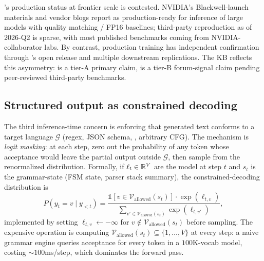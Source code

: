 \begin{contradiction}
's production status at frontier scale is contested. NVIDIA's
Blackwell-launch materials and vendor blogs report  as
production-ready for inference of large models with quality matching
 / FP16 baselines; third-party reproduction as of 2026-Q2 is sparse,
with most published benchmarks coming from NVIDIA-collaborator labs.
By contrast,  production training has independent confirmation
through 's open release \citep[\S 2.5]{deepseek-v3} and
multiple downstream replications. The KB reflects this asymmetry: 
is a tier-A primary claim,  is a tier-B forum-signal claim
pending peer-reviewed third-party benchmarks.
\end{contradiction}

\subsection{Structured output as constrained decoding}
\label{sec:constrained-decoding}

The third inference-time concern is enforcing that generated text
conforms to a target language $\mathcal{G}$ (regex, JSON schema, ,
arbitrary CFG). The mechanism is \emph{logit masking}: at each step,
zero out the probability of any token whose acceptance would leave the
partial output outside $\mathcal{G}$, then sample from the renormalized
distribution. Formally, if $\ell_t \in \mathbb{R}^V$ are the model  at
step $t$ and $s_t$ is the grammar-state (FSM state, parser stack
summary), the constrained-decoding distribution is
\begin{equation}
P(y_t = v \mid y_{<t}) = \frac{\mathbb{1}[v \in \mathcal{V}_{\text{allowed}}(s_t)] \cdot \exp(\ell_{t,v})}{\sum_{v' \in \mathcal{V}_{\text{allowed}}(s_t)} \exp(\ell_{t,v'})},
\label{eq:constrained-decoding}
\end{equation}
implemented by setting $\ell_{t,v} \leftarrow -\infty$ for
$v \notin \mathcal{V}_{\text{allowed}}(s_t)$ before sampling. The
expensive operation is computing
$\mathcal{V}_{\text{allowed}}(s_t) \subseteq \{1, \dots, V\}$ at every
step: a naive grammar engine queries acceptance for every token in a
$100$K-vocab model, costing $\sim 100$ms/step, which dominates the
forward pass.

